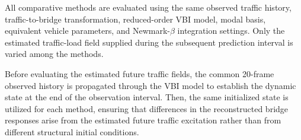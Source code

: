 \documentclass[journal]{IEEEtran}
\begin{document}
All comparative methods
are evaluated using the same observed traffic history, traffic-to-bridge
transformation, reduced-order VBI model, modal basis, equivalent vehicle
parameters, and Newmark-$\beta$ integration settings. Only the estimated
traffic-load field supplied during the subsequent prediction interval is varied
among the methods.

Before evaluating the
estimated future traffic fields, the common 20-frame observed history is
propagated through the VBI model to establish the dynamic state at the end of
the observation interval. Then, the same initialized state is utilized for each
method, ensuring that differences in the reconstructed bridge responses arise
from the estimated future traffic excitation rather than from different
structural initial conditions.

\begin{table}[!tbp]
\centering
\caption{Traffic-state and traffic-load estimation performance on the held-out test set.}
\label{tab:traffic_performance}
\scriptsize
\setlength{\tabcolsep}{4pt}
\renewcommand{\arraystretch}{1.15}

\end{table}
\end{document}

